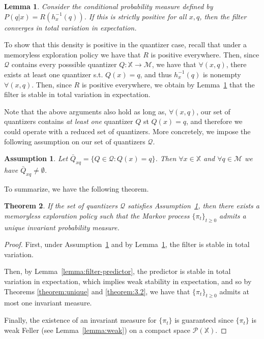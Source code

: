 \documentclass[conference]{IEEEtran}
\newtheorem{theorem}{Theorem}[section]
\newtheorem{lemma}[theorem]{Lemma}
\newtheorem{assumption}{Assumption}[section]
\begin{document}
\begin{lemma}\label{lemma:nondegenerate}\cite[Corollary 5.5]{Handel}
    Consider the conditional probability measure defined by \( P(q | x) = R(h_x^{-1}(q)) \). If this is strictly positive for all \(x,q\), then the filter converges in total variation in expectation.
\end{lemma}

To show that this density is positive in the quantizer case, recall that under a memoryless exploration policy we have that \(R\) is positive everywhere. Then, since \( \mathcal{Q} \) contains every posssible quantizer \( Q : \mathbb{X} \to \mathcal{M} \), we have that \( \forall (x,q) \), there exists at least one quantizer s.t. \( Q(x) = q \), and thus \( h_x^{-1}(q) \) is nonempty \( \forall (x,q) \). Then, since \(R\) is positive everywhere, we obtain by Lemma~\ref{lemma:nondegenerate} that the filter is stable in total variation in expectation.

Note that the above arguments also hold as long as, \( \forall (x,q) \), our set of quantizers contains \emph{at least one} quantizer \( Q \) st \( Q(x) = q \), and therefore we could operate with a reduced set of quantizers. More concretely, we impose the following assumption on our set of quantizers \( \mathcal{Q} \).

\begin{assumption}\label{assumption:one-bin}
    Let \( \bar{Q}_{xq} = \{Q \in \mathcal{Q} : Q(x) = q\} \). Then \( \forall x \in \mathbb{X} \) and \( \forall q \in \mathcal{M} \) we have \(\bar{Q}_{xq} \neq \emptyset \).

\end{assumption}

\noindent To summarize, we have the following theorem.

\begin{theorem}\label{theorem:invariant}
    If the set of quantizers \( \mathcal{Q} \) satisfies Assumption~\ref{assumption:one-bin}, then there exists a memoryless exploration policy such that the Markov process \( \{\pi_t\}_{t\ge0} \) admits a unique invariant probability measure.
\end{theorem}

\begin{proof}
    First, under Assumption~\ref{assumption:one-bin} and by Lemma~\ref{lemma:nondegenerate}, the filter is stable in total variation.

    Then, by Lemma~\ref{lemma:filter-predictor}, the predictor is stable in total variation in expectation, which implies weak stability in expectation, and so by Theorems \ref{theorem:unique} and \ref{theorem:3.2}, we have that \( \{\pi_t\}_{t\ge0} \) admits at most one invariant measure.

    Finally, the existence of an invariant measure for \( \{\pi_t\} \) is guaranteed since \( \{\pi_t\} \) is weak Feller (see Lemma~\ref{lemma:weak}) on a compact space \( \mathcal{P}(\mathbb{X}) \).
\end{proof}
\end{document}
